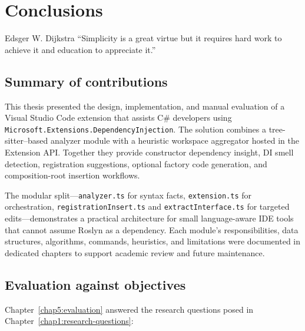 \chapter{Conclusions}
\label{conclusions}
\begin{chapquote}{Edsger W. Dijkstra}
``Simplicity is a great virtue but it requires hard work to achieve it and education to appreciate it.''
\end{chapquote}

\section{Summary of contributions}

This thesis presented the design, implementation, and manual evaluation of a Visual Studio Code extension that assists C\# developers using \texttt{Microsoft.Extensions.DependencyInjection}. The solution combines a tree-sitter--based analyzer module with a heuristic workspace aggregator hosted in the Extension API. Together they provide constructor dependency insight, DI smell detection, registration suggestions, optional factory code generation, and composition-root insertion workflows.

The modular split---\texttt{analyzer.ts} for syntax facts, \texttt{extension.ts} for orchestration, \texttt{registrationInsert.ts} and \texttt{extractInterface.ts} for targeted edits---demonstrates a practical architecture for small language-aware IDE tools that cannot assume Roslyn as a dependency. Each module's responsibilities, data structures, algorithms, commands, heuristics, and limitations were documented in dedicated chapters to support academic review and future maintenance.

\section{Evaluation against objectives}

Chapter~\ref{chap5:evaluation} answered the research questions posed in Chapter~\ref{chap1:research-questions}:

